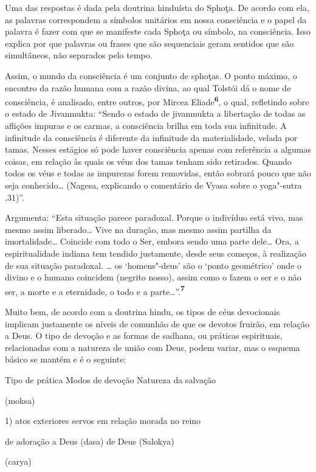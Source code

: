 Uma das respostas é dada pela doutrina hinduísta do Sphoţa. De acordo
com ela, as palavras correspondem a símbolos unitários em nossa
consciência e o papel da palavra é fazer com que se manifeste cada
Sphoţa ou símbolo, na consciência. Isso explica por que palavras ou
frases que são sequenciais geram sentidos que são simultâneos, não
separados pelo tempo.

Assim, o mundo da consciência é um conjunto de sphoţas. O ponto máximo,
o encontro da razão humana com a razão divina, ao qual Tolstói dá o nome
de consciência, é analisado, entre outros, por Mircea
Eliade\textbf{\textsuperscript{6}}, o qual, refletindo sobre o estado de
Jivanmukta: ``Sendo o estado de jivanmukta a libertação de todas as
aflições impuras e os carmas, a consciência brilha em toda sua
infinitude. A infinitude da consciência é diferente da infinitude da
materialidade, velada por tamas. Nesses estágios só pode haver
consciência apenas com referência a algumas coisas, em relação às quais
os véus dos tamas tenham sido retirados. Quando todos os véus e todas as
impurezas forem removidas, então sobrará pouco que não seja
conhecido\ldots{} (Nagesa, explicando o comentário de Vyasa sobre o
yoga"-sutra .31)''.

Argumenta: ``Esta situação parece paradoxal. Porque o indivíduo está
vivo, mas mesmo assim liberado\ldots{} Vive na duração, mas mesmo assim
partilha da imortalidade\ldots{} Coincide com todo o Ser, embora sendo uma
parte dele\ldots{} Ora, a espiritualidade indiana tem tendido justamente,
desde seus começos, à realização de sua situação paradoxal. \ldots{} os
`homens"-deus' são o `ponto geométrico' onde o divino e o humano
coincidem (negrito nosso), assim como o fazem o ser e o não ser, a morte
e a eternidade, o todo e a parte\ldots{}''.\textbf{\textsuperscript{7}}

Muito bem, de acordo com a doutrina hindu, os tipos de céus devocionais
implicam justamente os níveis de comunhão de que os devotos fruirão, em
relação a Deus. O tipo de devoção e as formas de sadhana, ou práticas
espirituais, relacionadas com a natureza de união com Deus, podem
variar, mas o esquema básico se mantém e é o seguinte:

Tipo de prática Modos de devoção Natureza da salvação

(moksa)

1) atos exteriores servos em relação morada no reino

de adoração a Deus (dasa) de Deus (Salokya)

(carya)

